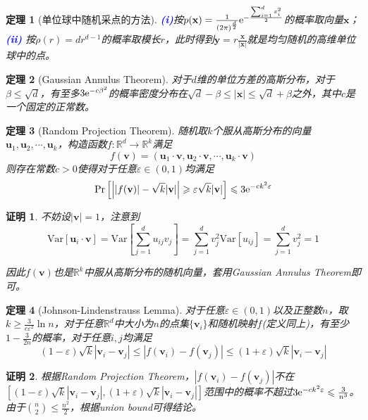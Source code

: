 \documentclass[8pt]{article}
\theoremstyle{compact}
\newtheorem{theorem}{定理}
\newtheorem{Proof}{证明}
\def\num#1{\textnormal{\textbf{\mbox{\textcolor{blue}{(#1)}}}}}
\def\le{\leqslant}
\def\ge{\geqslant}
\def\Pr#1{\text{Pr}\left[{#1}\right]}
\def\Var#1{\text{Var}\left[{#1}\right]}
\begin{document}
\begin{theorem}[单位球中随机采点的方法]
	
	 \num{i}按$p(\mathbf x) = \frac{1}{(2\pi)^{\frac d2}}\text e^{-\frac{\sum_{i=1}^{d}x_i^2}{2}}$的概率取向量$\mathbf x$；
	\num{ii} 按$\rho(r) = dr^{d-1}$的概率取模长$r$，此时得到$\mathbf y = r\frac{\mathbf x}{|\mathbf x|}$就是均匀随机的高维单位球中的点。
\end{theorem}
\begin{theorem}[Gaussian Annulus Theorem]
	对于$d$维的单位方差的高斯分布，对于$\beta \le \sqrt d$，有至多$3\text e^{-c\beta^2}$的概率密度分布在$\sqrt d - \beta \le |\mathbf x| \le \sqrt d + \beta$之外，其中$c$是一个固定的正常数。
\end{theorem}
\begin{theorem}[Random Projection Theorem]
	随机取$k$个服从高斯分布的向量$\mathbf u_1, \mathbf u_2, \cdots, \mathbf u_k$，构造函数$f: \mathbb R^d \to \mathbb R^k$满足
	\begin{equation}
	f(\mathbf v) = (\mathbf u_1 \cdot \mathbf v, \mathbf u_2 \cdot \mathbf v, \cdots, \mathbf u_k \cdot \mathbf v)
	\end{equation}
	则存在常数$c > 0$使得对于任意$\varepsilon \in (0, 1)$均满足
	\begin{equation}
	\Pr{ \left| |f(\mathbf v)| - \sqrt k |\mathbf v|\right| \ge \varepsilon \sqrt k |\mathbf v|} \le 3\text e^{-ck^2\varepsilon}
	\end{equation}
\end{theorem}
\begin{Proof}
	不妨设$|\mathbf v| = 1$，注意到
	\begin{equation}
	\Var{\mathbf u_i \cdot \mathbf v} = \Var{\sum_{j=1}^{d}u_{ij}v_j} = \sum_{j=1}^{d}v_j^2\Var{u_{ij}} = \sum_{j=1}^{d}v_j^2 = 1
	\end{equation}
	
	因此$f(\mathbf v)$也是$\mathbb R^k$中服从高斯分布的随机向量，套用Gaussian Annulus Theorem即可。
\end{Proof}
\begin{theorem}[Johnson-Lindenstrauss Lemma]
	对于任意$\varepsilon \in (0, 1)$以及正整数$n$，取$k \ge \frac{3}{c\varepsilon^2}\ln n$，对于任意$\mathbb R^d$中大小为$n$的点集$\{\mathbf v_i\}$和随机映射$f$(定义同上)，有至少$1 - \frac{3}{2n}$的概率，对于任意$i, j$均满足
	\begin{equation}
		(1 - \varepsilon)\sqrt{k}|\mathbf v_i - \mathbf v_j| \le |f(\mathbf v_i) - f(\mathbf v_j)| \le (1 + \varepsilon)\sqrt{k}|\mathbf v_i - \mathbf v_j|
	\end{equation}
\end{theorem}
\begin{Proof}
	根据Random Projection Theorem，$|f(\mathbf v_i) - f(\mathbf v_j)|$不在$\left[ (1 - \varepsilon)\sqrt{k}|\mathbf v_i - \mathbf v_j| ,(1 + \varepsilon)\sqrt{k}|\mathbf v_i - \mathbf v_j| \right]$范围中的概率不超过$3\text e^{-ck^2\varepsilon} \le \frac{3}{n^3}$。由于$\binom{n}{2} \le \frac{n^2}{2}$，根据union bound可得结论。
\end{Proof}
\end{document}
